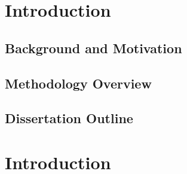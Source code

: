 \documentclass[12pt, letterpaper]{report}   %
\begin{document}

\newpage
\endofprelim
\cleardoublepage





\chapter{Introduction}
\label{introduction}



\section{Background and Motivation}
\label{sec:intro-background}



\section{Methodology Overview}
\label{sec:intro-methodology}



\section{Dissertation Outline}
\label{sec:intro-outline}


\clearpage


\chapter*{}

\chapter{Introduction }
\label{sec:reachability-intro}
\end{document}
